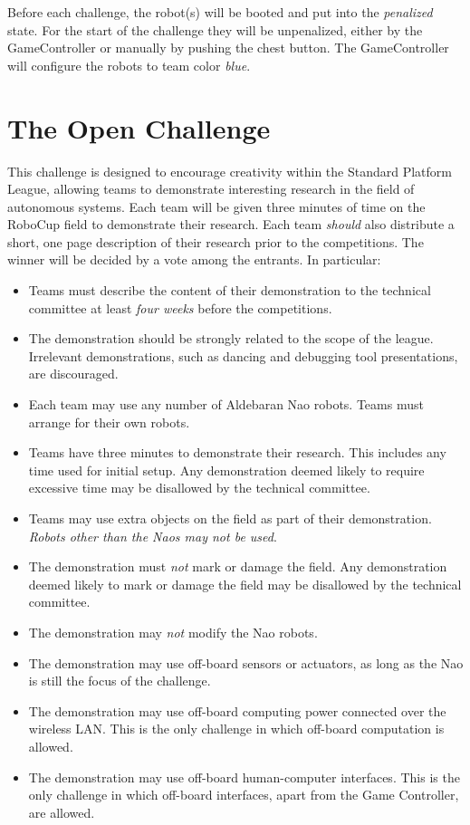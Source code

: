 \documentclass{article}
\begin{document}
Before each challenge, the robot(s) will be booted and put into the \emph{penalized} 
state. For the start of the challenge they will be unpenalized, either by the 
GameController or manually by pushing the chest button. The GameController will 
configure the robots to team color \emph{blue}.


\section{The Open Challenge}
\label{sec:open}
\newcommand{\openMinNum}{three}

This challenge is designed to encourage creativity within the Standard 
Platform League, allowing teams to demonstrate interesting research in 
the field of autonomous systems. Each team will be given \openMinNum{} 
minutes of time on the RoboCup field to demonstrate their research. 
Each team \emph{should} also distribute a short, one page description of 
their research prior to the competitions. The winner will be decided by 
a vote among the entrants. In particular:

\begin{itemize}
\item 
Teams must describe the content of their demonstration to the technical 
committee at least \emph{four weeks} before the competitions. 
\item 
The demonstration should be strongly related to the scope of the league. 
Irrelevant demonstrations, such as dancing and debugging tool presentations, 
are discouraged.
\item 
Each team may use any number of Aldebaran Nao robots. Teams must arrange
for their own robots.
\item 
Teams have \openMinNum{} minutes to demonstrate their research. This
includes any time used for initial setup. Any demonstration deemed
likely to require excessive time may be disallowed by the technical
committee.
\item 
Teams may use extra objects on the field as part of their
demonstration. \emph{Robots other than the Naos may not be used}.
\item 
The demonstration must \emph{not} mark or damage the field. Any
demonstration deemed likely to mark or damage the field may be
disallowed by the technical committee.
\item
The demonstration may \emph{not} modify the Nao robots.
\item 
The demonstration may use off-board sensors or
actuators, as long as the Nao is still the focus of the challenge.
\item 
The demonstration may use off-board computing power connected over the
wireless LAN. This is the only challenge in which off-board
computation is allowed.
\item 
The demonstration may use off-board human-computer interfaces. This
is the only challenge in which off-board interfaces, apart from the
Game Controller, are allowed.
\end{itemize}
\end{document}
